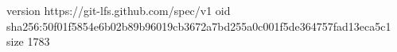 version https://git-lfs.github.com/spec/v1
oid sha256:50f01f5854e6b02b89b96019cb3672a7bd255a0c001f5de364757fad13eca5c1
size 1783
